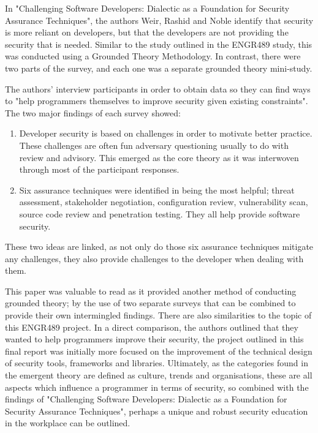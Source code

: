 In "Challenging Software Developers: Dialectic as a Foundation for Security Assurance Techniques"\cite{charles}, the authors Weir, Rashid and Noble identify that security is more reliant on developers, but that the developers are not providing the security that is needed. Similar to the study outlined in the ENGR489 study, this was conducted using a Grounded Theory Methodology. In contrast, there were two parts of the survey, and each one was a separate grounded theory mini-study. 
\newline
\par The authors' interview participants in order to obtain data so they can find ways to "help programmers themselves to improve security given existing constraints".  
\newline
\newline
The two major findings of each survey showed:

\begin{enumerate}
\item Developer security is based on challenges in order to motivate better practice. These challenges are often fun adversary questioning usually to do with review and advisory.  This emerged as the core theory as it was interwoven through most of the participant responses.
\item Six assurance techniques were identified in being the most helpful; threat assessment, stakeholder negotiation, configuration review, vulnerability scan, source code review and penetration testing. They all help provide software security. 
\end{enumerate}

\par These two ideas are linked, as not only do those six assurance techniques mitigate any challenges, they also provide challenges to the developer when dealing with them. 
\newline
\par This paper was valuable to read as it provided another method of conducting grounded theory; by the use of two separate surveys that can be combined to provide their own intermingled findings. There are also similarities to the topic of this ENGR489 project. In a direct comparison, the authors outlined that they wanted to help programmers improve their security, the project outlined in this final report was initially more focused on the improvement of the technical design of security tools, frameworks and libraries. Ultimately, as the categories found in the emergent theory are defined as culture, trends and organisations, these are all aspects which influence a programmer in terms of security, so combined with the findings of "Challenging Software Developers: Dialectic as a Foundation for Security Assurance Techniques", perhaps a unique and robust security education in the workplace can be outlined. 
\newline
\par

